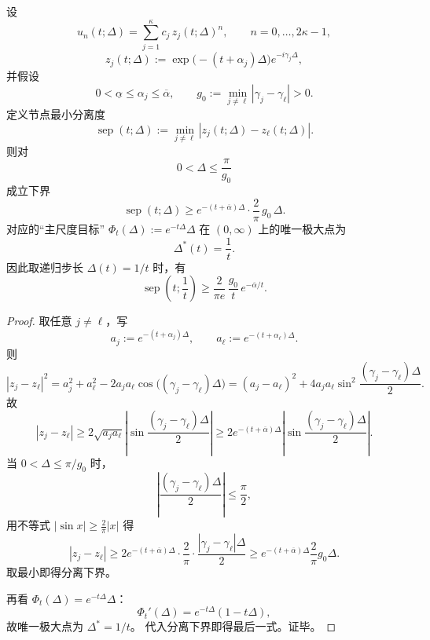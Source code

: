 \begin{theorem}\label{thm:conclusion-stieltjes-prony-step-optimal-law}
设
\[
u_n(t;\Delta)=\sum_{j=1}^{\kappa}c_j\,z_j(t;\Delta)^n,\qquad n=0,\dots,2\kappa-1,
\]
\[
z_j(t;\Delta):=\exp\!\bigl(-(t+\alpha_j)\Delta\bigr)e^{-i\gamma_j\Delta},
\]
并假设
\[
0<\underline\alpha\le \alpha_j\le \overline\alpha,\qquad
g_0:=\min_{j\neq \ell}|\gamma_j-\gamma_\ell|>0.
\]
定义节点最小分离度
\[
\operatorname{sep}(t;\Delta):=\min_{j\neq \ell}|z_j(t;\Delta)-z_\ell(t;\Delta)|.
\]
则对
\[
0<\Delta\le \frac{\pi}{g_0}
\]
成立下界
\[
\operatorname{sep}(t;\Delta)\ge
e^{-(t+\overline\alpha)\Delta}\cdot \frac{2}{\pi}\,g_0\,\Delta.
\]
对应的“主尺度目标” \(\Phi_t(\Delta):=e^{-t\Delta}\Delta\) 在 \((0,\infty)\) 上的唯一极大点为
\[
\Delta^\ast(t)=\frac1t.
\]
因此取递归步长 \(\Delta(t)=1/t\) 时，有
\[
\operatorname{sep}\!\left(t;\frac1t\right)
\ge
\frac{2}{\pi e}\,\frac{g_0}{t}\,e^{-\overline\alpha/t}.
\]
\end{theorem}
\begin{proof}
取任意 \(j\neq \ell\)，写
\[
a_j:=e^{-(t+\alpha_j)\Delta},\qquad
a_\ell:=e^{-(t+\alpha_\ell)\Delta}.
\]
则
\[
|z_j-z_\ell|^2
=
a_j^2+a_\ell^2-2a_ja_\ell\cos\big((\gamma_j-\gamma_\ell)\Delta\big)
=
(a_j-a_\ell)^2+4a_ja_\ell\sin^2\!\frac{(\gamma_j-\gamma_\ell)\Delta}{2}.
\]
故
\[
|z_j-z_\ell|
\ge
2\sqrt{a_ja_\ell}\left|\sin\frac{(\gamma_j-\gamma_\ell)\Delta}{2}\right|
\ge
2e^{-(t+\overline\alpha)\Delta}\left|\sin\frac{(\gamma_j-\gamma_\ell)\Delta}{2}\right|.
\]
当 \(0<\Delta\le\pi/g_0\) 时，
\[
\left|\frac{(\gamma_j-\gamma_\ell)\Delta}{2}\right|\le \frac{\pi}{2},
\]
用不等式 \(|\sin x|\ge \frac{2}{\pi}|x|\) 得
\[
|z_j-z_\ell|
\ge
2e^{-(t+\overline\alpha)\Delta}\cdot
\frac{2}{\pi}\cdot\frac{|\gamma_j-\gamma_\ell|\Delta}{2}
\ge
e^{-(t+\overline\alpha)\Delta}\frac{2}{\pi}g_0\Delta.
\]
取最小即得分离下界。

再看 \(\Phi_t(\Delta)=e^{-t\Delta}\Delta\)：
\[
\Phi_t'(\Delta)=e^{-t\Delta}(1-t\Delta),
\]
故唯一极大点为 \(\Delta^\ast=1/t\)。
代入分离下界即得最后一式。证毕。
\end{proof}

